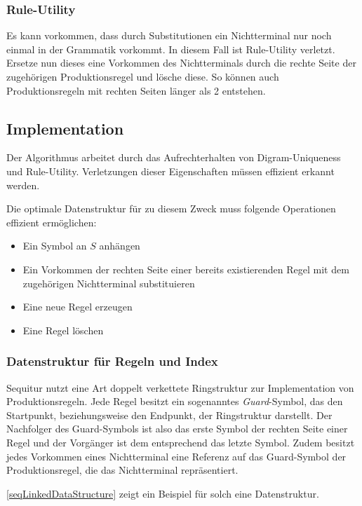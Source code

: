\subsubsection{Rule-Utility}

Es kann vorkommen, dass durch Substitutionen ein Nichtterminal nur noch einmal in der Grammatik vorkommt. In diesem Fall ist Rule-Utility verletzt. Ersetze nun dieses eine Vorkommen des Nichtterminals durch die rechte Seite der zugehörigen Produktionsregel und lösche diese. So können auch Produktionsregeln mit rechten Seiten länger als 2 entstehen.

\subsection{Implementation}

Der Algorithmus arbeitet durch das Aufrechterhalten von Digram-Uniqueness und Rule-Utility. Verletzungen dieser Eigenschaften müssen effizient erkannt werden.

Die optimale Datenstruktur für zu diesem Zweck muss folgende Operationen effizient ermöglichen:

\begin{itemize}
	\item Ein Symbol an $S$ anhängen
	\item Ein Vorkommen der rechten Seite einer bereits existierenden Regel mit dem zugehörigen Nichtterminal substituieren
	\item Eine neue Regel erzeugen
	\item Eine Regel löschen
\end{itemize}

\subsubsection{Datenstruktur für Regeln und Index}

Sequitur nutzt eine Art doppelt verkettete Ringstruktur zur Implementation von Produktionsregeln. 
Jede Regel besitzt ein sogenanntes \emph{Guard}-Symbol, das den Startpunkt, beziehungsweise den Endpunkt, der Ringstruktur darstellt. Der Nachfolger des Guard-Symbols ist also das erste Symbol der rechten Seite einer Regel und der Vorgänger ist dem entsprechend das letzte Symbol.
Zudem besitzt jedes Vorkommen eines Nichtterminal eine Referenz auf das Guard-Symbol der Produktionsregel, die das Nichtterminal repräsentiert. 

\autoref{seqLinkedDataStructure} zeigt ein Beispiel für solch eine Datenstruktur.

